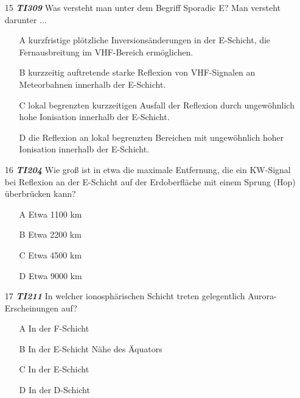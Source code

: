 \begin{enumerate} 
\itemsep1pt\parskip0pt
\item[15] \emph{\textbf{TI309}}   Was versteht man unter dem Begriff Sporadic E? Man versteht darunter ...
	\begin{enumerate}
	\itemsep1pt\parskip0pt
		\item[A] kurzfristige plötzliche Inversionsänderungen in der E-Schicht, die Fernausbreitung im VHF-Bereich ermöglichen.
		\item[B] kurzzeitig auftretende starke Reflexion von VHF-Signalen an Meteorbahnen innerhalb der E-Schicht.
		\item[C] lokal begrenzten kurzzeitigen Ausfall der Reflexion durch ungewöhnlich hohe Ionisation innerhalb der E-Schicht.
		\item[D] die Reflexion an lokal begrenzten Bereichen mit ungewöhnlich hoher Ionisation innerhalb der E-Schicht.
	\end{enumerate}
\end{enumerate}

\begin{enumerate} 
\itemsep1pt\parskip0pt
\item[16] \emph{\textbf{TI204}}  Wie groß ist in etwa die maximale Entfernung, die ein KW-Signal bei Reflexion an der E-Schicht auf der Erdoberfläche mit einem Sprung (Hop) überbrücken kann?
	\begin{enumerate}
	\itemsep1pt\parskip0pt
		\item[A] Etwa 1100 km
		\item[B] Etwa 2200 km
		\item[C] Etwa 4500 km
		\item[D] Etwa 9000 km
	\end{enumerate}
\end{enumerate}


\begin{enumerate} 
\itemsep1pt\parskip0pt
\item[17] \emph{\textbf{TI211}}   In welcher ionosphärischen Schicht treten gelegentlich Aurora-Erscheinungen auf?
	\begin{enumerate}
	\itemsep1pt\parskip0pt
		\item[A] In der F-Schicht
		\item[B] In der E-Schicht Nähe des Äquators
		\item[C] In der E-Schicht
		\item[D] In der D-Schicht
	\end{enumerate}
\end{enumerate}

